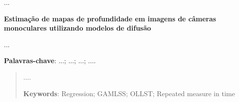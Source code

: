 	...
	
	\begin{resumo}
	
	  \begin{center}{
	    \textbf{Estimação de mapas de profundidade em imagens de câmeras monoculares utilizando modelos de difusão}}
	  \end{center}
	
	\begin{spacing}{1.0}
	  ...
	\end{spacing}
	{\hspace{-8mm} \bf{Palavras-chave}}: ...; ...; ...; ....
	
	\end{resumo}
	
	\begin{abstract}
	
	....
	
	{\hspace{-8mm} \bf{Keywords}}: Regression; GAMLSS; OLLST; Repeated measure in time
	
	\end{abstract}
	
	\listoffigures
	
	\cleardoublepage
	\listoftables
	\cleardoublepage
	
	\pagestyle{ruledheader}
	\tableofcontents